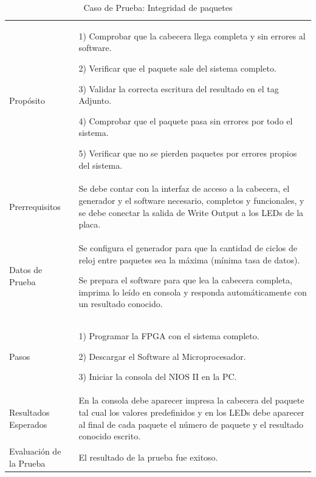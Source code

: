 \begin{table}
	\begin{tabular}{|>{\columncolor[gray]{0.8}}l|p{11cm}|} \hline
\multicolumn{2}{|>{\columncolor[gray]{0.8}}l|}{\textbf{Caso de Prueba: Integridad de paquetes }}\\ \hline
Propósito  & 1) Comprobar que la cabecera llega completa y sin errores al software. 

2) Verificar que el paquete sale del sistema completo.

3) Validar la correcta escritura del resultado en el tag Adjunto.

4) Comprobar que el paquete pasa sin errores por todo el sistema. 

5) Verificar que no se pierden paquetes por errores propios del sistema. 
\\ \hline
 Prerrequisitos  & Se debe contar con la interfaz de acceso a la cabecera, el generador y el software necesario, completos y funcionales, y se debe conectar la salida de Write Output a los LEDs de la placa.\\ \hline
 Datos de Prueba & Se configura el generador para que la cantidad de ciclos de reloj entre paquetes sea la máxima (mínima tasa de datos). 

Se prepara el software para que lea la cabecera completa, imprima lo leído en consola y responda automáticamente con un resultado conocido. 
 \\ \hline
 Pasos & 1) Programar la FPGA con el sistema completo.

2) Descargar el Software al Microprocesador.

3) Iniciar la consola del NIOS II en la PC.
\\ \hline
 Resultados Esperados & En la consola debe aparecer impresa la cabecera del paquete tal cual los valores predefinidos y en los LEDs debe aparecer al final de cada paquete el número de paquete y el resultado conocido escrito.  \\ \hline
 Evaluación de la Prueba  & El resultado de la prueba fue exitoso.\\ \hline
	\end{tabular}
	\caption{Caso de Prueba: Integridad de paquetes}
	\label{tab:integridad}
\end{table}
